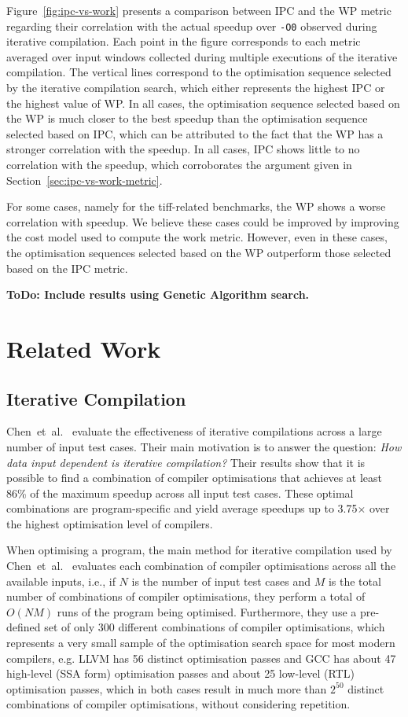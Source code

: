 \documentclass[sigplan,10pt]{acmart}
\theoremstyle{definition}
\newcommand{\etal}{et~al.}
\newcommand{\itercomp}{{iterative compilation}}
\newcommand{\IterComp}{{Iterative Compilation}}
\begin{document}
Figure~\ref{fig:ipc-vs-work} presents a comparison between IPC and the WP metric regarding their correlation with the actual speedup over \verb|-O0| observed during {\itercomp}.
Each point in the figure corresponds to each metric averaged over input windows collected during multiple executions of the {\itercomp}.
The vertical lines correspond to the optimisation sequence selected by the {\itercomp} search, which either represents the highest IPC or the highest value of WP.
In all cases, the optimisation sequence selected based on the WP is much closer to the best speedup than the optimisation sequence selected based on IPC, which can be attributed to the fact that the WP has a stronger correlation with the speedup.
In all cases, IPC shows little to no correlation with the speedup, which corroborates the argument given in Section~\ref{sec:ipc-vs-work-metric}.

For some cases, namely for the tiff-related benchmarks, the WP shows a worse correlation with speedup.
We believe these cases could be improved by improving the cost model used to compute the work metric.
However, even in these cases, the optimisation sequences selected based on the WP outperform those selected based on the IPC metric.

\textbf{ToDo: Include results using Genetic Algorithm search.}

\section{Related Work}

\subsection{{\IterComp}}

Chen~\etal~\cite{chen10,chen12a} evaluate the effectiveness of iterative compilations across a large number of input test cases.
Their main motivation is to answer the question:
\textit{How data input dependent is {\itercomp}?}
Their results show that it is possible to find a combination of compiler optimisations that achieves at least 86\% of the maximum speedup across all input test cases.
These optimal combinations are program-specific and yield average speedups up to 3.75$\times$ over the highest optimisation level of compilers.

When optimising a program, the main method for {\itercomp} used by Chen~\etal~\cite{chen10,chen12a} evaluates each combination of compiler optimisations across all the available inputs, i.e., if $N$ is the number of input test cases and $M$ is the total number of combinations of compiler optimisations, they perform a total of $O(NM)$ runs of the program being optimised.
Furthermore, they use a pre-defined set of only 300 different combinations of compiler optimisations, which represents a very small sample of the optimisation search space for most modern compilers, e.g.
LLVM has 56 distinct optimisation passes and GCC has about 47 high-level (SSA form) optimisation passes and about 25 low-level (RTL) optimisation passes, which in both cases result in much more than $2^{50}$ distinct combinations of compiler optimisations, without considering repetition.
\end{document}
